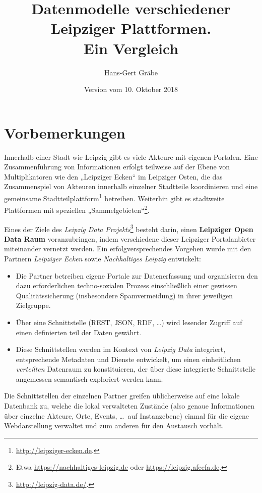 \documentclass[a4paper,11pt]{article}
\title{Datenmodelle verschiedener Leipziger Plattformen.\\ Ein Vergleich}
\author{Hans-Gert Gräbe}
\date{Version vom 10. Oktober 2018}
\begin{document}
\maketitle
\tableofcontents 
\newpage

\section{Vorbemerkungen}

Innerhalb einer Stadt wie Leipzig gibt es viele Akteure mit eigenen Portalen.
Eine Zusammenführung von Informationen erfolgt teilweise auf der Ebene von
Multiplikatoren wie den „Leipziger Ecken“ im Leipziger Osten, die das
Zusammenspiel von Akteuren innerhalb einzelner Stadtteile koordinieren und
eine gemeinsame Stadtteilplattform\footnote{\url{http://leipziger-ecken.de}.}
betreiben.  Weiterhin gibt es stadtweite Plattformen mit speziellen
„Sammelgebieten“\footnote{Etwa \url{https://nachhaltiges-leipzig.de} oder
\url{https://leipzig.afeefa.de}.}.

Eines der Ziele des \emph{Leipzig Data
  Projekts}\footnote{\url{http://leipzig-data.de/}.} besteht darin, einen
\textbf{Leipziger Open Data Raum} voranzubringen, indem verschiedene dieser
Leipziger Portalanbieter miteinander vernetzt werden. Ein erfolgversprechendes
Vorgehen wurde mit den Partnern \emph{Leipziger Ecken} sowie
\emph{Nachhaltiges Leipzig} entwickelt:
\begin{itemize}
\item [1)] Die Partner betreiben eigene Portale zur Datenerfassung und
  organisieren den dazu erforderlichen techno-sozialen Prozess einschließlich
  einer gewissen Qualitätssicherung (insbesondere Spamvermeidung) in ihrer
  jeweiligen Zielgruppe. 
\item [2)] Über eine Schnittstelle (REST, JSON, RDF, \ldots) wird lesender
  Zugriff auf einen definierten teil der Daten gewährt.
\item [3)] Diese Schnittstellen werden im Kontext von \emph{Leipzig Data}
  integriert, entsprechende Metadaten und Dienste entwickelt, um einen
  einheitlichen \emph{verteilten} Datenraum zu konstituieren, der über diese
  integrierte Schnittstelle angemessen semantisch exploriert werden kann. 
\end{itemize}
Die Schnittstellen der einzelnen Partner greifen üblicherweise auf eine lokale
Datenbank zu, welche die lokal verwalteten Zustände (also genaue Informationen
über einzelne Akteure, Orte, Events, \ldots\ auf Instanzebene) einmal für die
eigene Webdarstellung verwaltet und zum anderen für den Austausch vorhält. 
\end{document}
